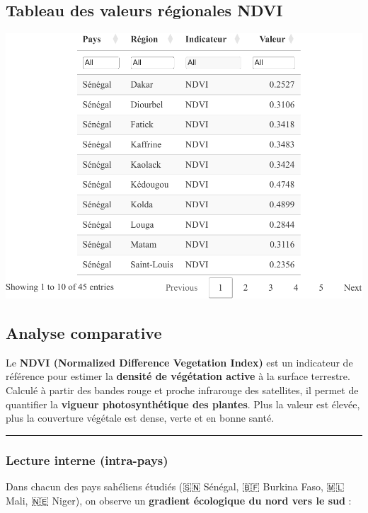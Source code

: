 \documentclass[
]{book}
\begin{document}
\subsection{Tableau des valeurs régionales NDVI}\label{tableau-des-valeurs-ruxe9gionales-ndvi}

\includegraphics{Atlas-Spectral-Sahel_files/figure-latex/ndvi-table-1.pdf}

\subsection{Analyse comparative}\label{analyse-comparative}

Le \textbf{NDVI (Normalized Difference Vegetation Index)} est un indicateur de référence pour estimer la \textbf{densité de végétation active} à la surface terrestre. Calculé à partir des bandes rouge et proche infrarouge des satellites, il permet de quantifier la \textbf{vigueur photosynthétique des plantes}. Plus la valeur est élevée, plus la couverture végétale est dense, verte et en bonne santé.

\begin{center}\rule{0.5\linewidth}{0.5pt}\end{center}

\subsubsection{Lecture interne (intra-pays)}\label{lecture-interne-intra-pays}

Dans chacun des pays sahéliens étudiés (🇸🇳 Sénégal, 🇧🇫 Burkina Faso, 🇲🇱 Mali, 🇳🇪 Niger), on observe un \textbf{gradient écologique du nord vers le sud} :
\end{document}
